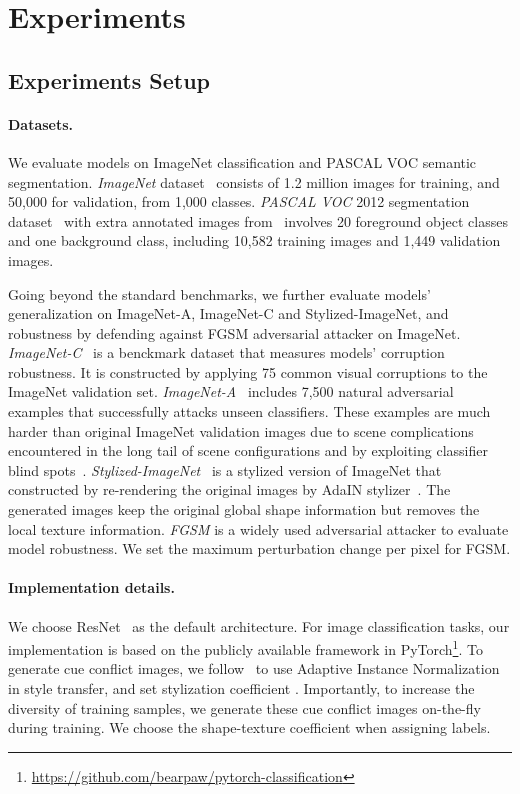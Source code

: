 \documentclass{article} \usepackage{iclr2021_conference,times}
\begin{document}
\section{Experiments}\label{sec:exp}

\subsection{Experiments Setup}
\label{sec:setup}
\paragraph{Datasets.} 
We evaluate models on ImageNet classification and PASCAL VOC semantic segmentation. \emph{ImageNet} dataset~\citep{ILSVRC15} consists of 1.2 million images for training, and 50,000 for validation, from 1,000 classes.  \emph{PASCAL VOC} 2012 segmentation dataset~\citep{pascal-voc-2012} with extra annotated images from~\citep{BharathICCV2011} involves 20 foreground object classes and one background class, including 10,582 training images and 1,449 validation images. 

Going beyond the standard benchmarks, we further evaluate models' generalization on ImageNet-A, ImageNet-C and Stylized-ImageNet, and robustness by defending against FGSM adversarial attacker on ImageNet. \emph{ImageNet-C}~\citep{hendrycks2018benchmarking} is a benckmark dataset that measures models' corruption robustness. It is constructed by applying 75 common visual corruptions to the ImageNet validation set. \emph{ImageNet-A}~\citep{hendrycks2019nae} includes 7,500 natural adversarial examples that successfully attacks unseen classifiers. These examples are much harder than original ImageNet validation images due to scene complications encountered in the long tail of scene configurations and by exploiting classifier blind spots~\citep{hendrycks2019nae}. \emph{Stylized-ImageNet}~\citep{geirhos2018imagenettrained} is a stylized version of ImageNet that constructed by re-rendering the original images by AdaIN stylizer~\citep{huang2017arbitrary}. The generated images keep the original global shape information but removes the local texture information.
\emph{FGSM} \citep{explaining2015goodfellow} is a widely used adversarial attacker to evaluate model robustness.
We set the maximum perturbation change per pixel  for FGSM. 

\paragraph{Implementation details.} We choose ResNet~\citep{he2016deep} as the default architecture. For image classification tasks, our implementation is based on the publicly available framework in PyTorch\footnote{\url{https://github.com/bearpaw/pytorch-classification}}. 
To generate cue conflict images, we follow~\citet{geirhos2018imagenettrained} to use Adaptive Instance Normalization~\citep{huang2017arbitrary} in style transfer, and set stylization coefficient . Importantly, to increase the diversity of training samples, we generate these cue conflict images on-the-fly during training. We choose the shape-texture coefficient  when assigning labels.  
\end{document}
